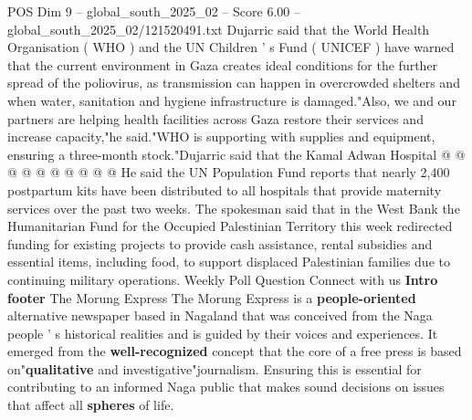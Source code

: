 \begin{textsample}{POS Dim 9 – global\_south\_2025\_02 – Score 6.00 – global\_south\_2025\_02/121520491.txt}
Dujarric said that the World Health Organisation ( WHO ) and the UN Children ' s Fund ( UNICEF ) have warned that the current environment in Gaza creates ideal conditions for the further spread of the poliovirus, as transmission can happen in overcrowded shelters and when water, sanitation and hygiene infrastructure is damaged."Also, we and our partners are helping health facilities across Gaza restore their services and increase capacity,"he said."WHO is supporting with supplies and equipment, ensuring a three-month stock."Dujarric said that the Kamal Adwan Hospital @ @ @ @ @ @ @ @ @ @ He said the UN Population Fund reports that nearly 2,400 postpartum kits have been distributed to all hospitals that provide maternity services over the past two weeks.
The spokesman said that in the West Bank the Humanitarian Fund for the Occupied Palestinian Territory this week redirected funding for existing projects to provide cash assistance, rental subsidies and essential items, including food, to support displaced Palestinian families due to continuing military operations.
Weekly Poll Question Connect with us \textbf{Intro} \textbf{footer} The Morung Express The Morung Express is a \textbf{people-oriented} alternative newspaper based in Nagaland that was conceived from the Naga people ' s historical realities and is guided by their voices and experiences.
It emerged from the \textbf{well-recognized} concept that the core of a free press is based on"\textbf{qualitative} and investigative"journalism.
Ensuring this is essential for contributing to an informed Naga public that makes sound decisions on issues that affect all \textbf{spheres} of life.

\end{textsample}
